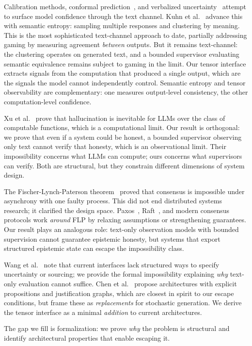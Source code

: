  Calibration methods, conformal
prediction~\cite{angelopoulos2021gentle}, and verbalized
uncertainty~\cite{kadavath2022language} attempt to surface model confidence
through the text channel. Kuhn et
al.~\cite{kuhn2023semanticuncertaintylinguisticinvariances} advance this with
semantic entropy: sampling multiple responses and clustering by meaning. This
is the most sophisticated text-channel approach to date, partially addressing
gaming by measuring agreement \emph{between} outputs. But it remains
text-channel: the clustering operates on generated text, and a bounded
supervisor evaluating semantic equivalence remains subject to gaming in the
limit. Our tensor interface extracts signals from the computation that produced
a single output, which are the signals the model cannot independently control. Semantic
entropy and tensor observability are complementary: one measures output-level
consistency, the other computation-level confidence.

 Xu et
al.~\cite{xu2024hallucination} prove that hallucination is inevitable for LLMs
over the class of computable functions, which is a computational limit. Our result is
orthogonal: we prove that even if a system could be honest, a bounded
supervisor observing only text cannot verify that honesty, which is an observational
limit. Their impossibility concerns what LLMs can compute; ours concerns what
supervisors can verify. Both are structural, but they constrain different
dimensions of system design.

 The
Fischer-Lynch-Paterson theorem~\cite{flp} proved that consensus is impossible
under asynchrony with one faulty process. This did not end distributed systems
research; it clarified the design space. Paxos~\cite{paxos}, Raft~\cite{raft}, and modern
consensus protocols work \emph{around} FLP by relaxing assumptions or
strengthening guarantees. Our result plays an analogous role: text-only
observation models with bounded supervision cannot guarantee epistemic honesty,
but systems that export structured epistemic state can escape the impossibility
class.

 Wang et
al.~\cite{wang2024epistemic} note that current interfaces lack structured ways
to specify uncertainty or sourcing; we provide the formal impossibility
explaining \emph{why} text-only evaluation cannot suffice. Chen et
al.~\cite{chen2025epistemic} propose architectures with explicit propositions
and justification graphs, which are closest in spirit to our escape conditions, but
frame these as \emph{replacements} for stochastic generation. We derive the
tensor interface as a minimal \emph{addition} to current architectures.

The gap we fill is formalization: we prove \emph{why} the problem is structural
and identify architectural properties that enable escaping it.
